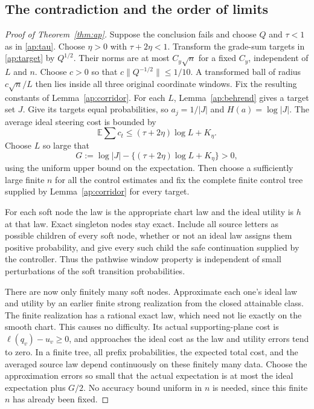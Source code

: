 \documentclass[11pt]{article}
\numberwithin{equation}{section}
\theoremstyle{definition}
\theoremstyle{remark}
\begin{document}
\subsection{The contradiction and the order of limits}

\begin{proof}[Proof of Theorem~\ref{thm:ap}]
Suppose the conclusion fails and choose \(Q\) and \(\tau<1\) as in
\eqref{ap:tau}.  Choose \(\eta>0\) with \(\tau+2\eta<1\).
Transform the grade-sum targets in \eqref{ap:target} by \(Q^{1/2}\).
Their norms are at most \(C_y\sqrt n\) for a fixed \(C_y\), independent
of \(L\) and \(n\).  Choose \(c>0\) so that
\(c\|Q^{-1/2}\|\leq1/10\).  A transformed ball of radius
\(c\sqrt n/L\) then lies inside all three original coordinate windows.
Fix the resulting constants of Lemma~\ref{ap:corridor}.
For each \(L\), Lemma~\ref{ap:behrend}
gives a target set \(J\).  Give its targets equal probabilities, so
\(a_j=1/|J|\) and \(H(a)=\log|J|\).  The average ideal steering
cost is bounded by
\[
 \mathbb E\sum c_t\leq(\tau+2\eta)\log L+K_\eta.
\]
Choose \(L\) so large that
\begin{equation}\label{ap:strict-gain}
 G:=\log|J|-\{(\tau+2\eta)\log L+K_\eta\}>0,
\end{equation}
using the uniform upper bound on the expectation.  Then choose a
sufficiently large finite \(n\) for all the control estimates and fix
the complete finite control tree supplied by Lemma~\ref{ap:corridor}
for every target.

For each soft node the law is the appropriate chart law and the ideal
utility is \(h\) at that law.  Exact singleton nodes stay exact.
Include all source letters as possible children of every soft node,
whether or not an ideal law assigns them positive probability, and give
every such child the safe continuation supplied by the controller.
Thus the pathwise window property is independent of small perturbations
of the soft transition probabilities.

There are now only finitely many soft nodes.  Approximate each one's
ideal law and utility by an earlier finite strong realization from the
closed attainable class.  The finite realization has a rational exact
law, which need not lie exactly on the smooth chart.  This causes no
difficulty.  Its actual supporting-plane cost is
\(\ell(q_v)-u_v\geq0\), and approaches the ideal cost as the law and
utility errors tend to zero.  In a finite tree, all prefix probabilities,
the expected total cost, and the averaged source law depend continuously
on these finitely many data.  Choose the approximation errors so small
that the actual expectation is at most the ideal expectation plus
\(G/2\).  No accuracy bound uniform in \(n\) is needed, since this
finite \(n\) has already been fixed.


\end{proof}
\end{document}
